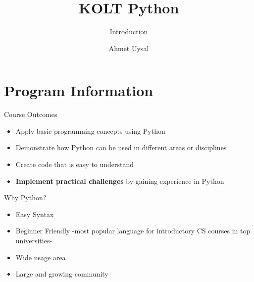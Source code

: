 


\usepackage{../KU-Beamer-Template/style/koc} 
\usepackage{minted}
\usepackage{upquote}

\title{KOLT Python} 
\subtitle{Introduction} 
\date{}
\author{Ahmet Uysal}




  \maketitle


	\section{Program Information}

	\begin{frame}{Course Outcomes}
		\LARGE
		\begin{itemize}
			\pause
			\item Apply basic programming concepts using Python
			\pause
			\item Demonstrate how Python can be used in different areas or disciplines
			\pause
			\item Create code that is easy to understand
			\pause
			\item \textbf{Implement practical challenges} by gaining experience in Python
		\end{itemize}
	\end{frame}

	\begin{frame}{Why Python?}
		\pause
		\begin{itemize}
			\LARGE
			\item Easy Syntax
			\pause
			\item Beginner Friendly
			-most popular language for introductory CS courses in top universities\cite{guo1}- 
			\pause
			\item Wide usage area
			\pause
			\item Large and growing community
		\end{itemize}
	\end{frame}

